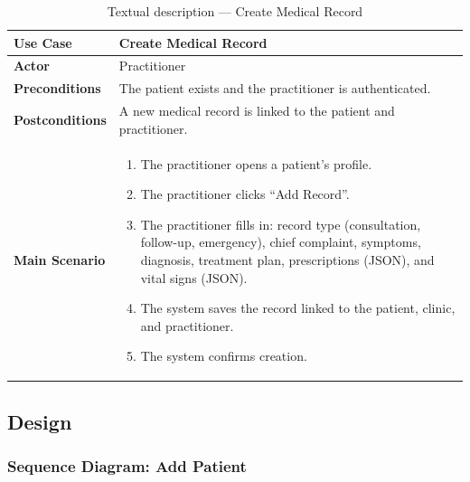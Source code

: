 \documentclass[12pt,a4paper,oneside]{report}
\begin{document}
\begin{table}[H]
\centering
\caption{Textual description — Create Medical Record}
\label{tab:uc_create_record}
\begin{tabular}{|p{3.5cm}|p{9.5cm}|}
\hline
\textbf{Use Case} & Create Medical Record \\
\hline
\textbf{Actor} & Practitioner \\
\hline
\textbf{Preconditions} & The patient exists and the practitioner is authenticated. \\
\hline
\textbf{Postconditions} & A new medical record is linked to the patient and practitioner. \\
\hline
\textbf{Main Scenario} &
\begin{enumerate}[leftmargin=*, nosep]
    \item The practitioner opens a patient's profile.
    \item The practitioner clicks ``Add Record''.
    \item The practitioner fills in: record type (consultation, follow-up, emergency), chief complaint, symptoms, diagnosis, treatment plan, prescriptions (JSON), and vital signs (JSON).
    \item The system saves the record linked to the patient, clinic, and practitioner.
    \item The system confirms creation.
\end{enumerate} \\
\hline
\end{tabular}
\end{table}

\subsection{Design}

\subsubsection{Sequence Diagram: Add Patient}
\end{document}
